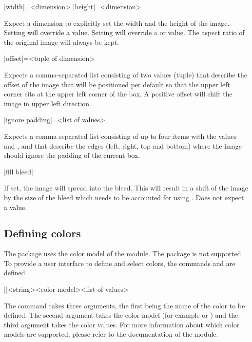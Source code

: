 \documentclass[a4paper]{article}
\begin{document}
\begin{macrodef}
|width|={<dimension>}
|height|={<dimension>}
\end{macrodef}
Expect a dimension to explicitly set the width and the height of the image. Setting  will override a  value. Setting  will override a  or  value. The aspect ratio of the original image will always be kept.

\begin{macrodef}
|offset|={<tuple of dimension>}
\end{macrodef}
Expects a comma-separated list consisting of two values (tuple) that describe the offset of the image that will be positioned per default so that the upper left corner sits at the upper left corner of the box. A positive offset will shift the image in upper left direction.

\begin{macrodef}
|ignore padding|={<list of values>}
\end{macrodef}
Expects a comma-separated list consisting of up to four items with the values  and ,  and  that describe the edges (left, right, top and bottom) where the image should ignore the padding of the current box.

\begin{macrodef}
|fill bleed|
\end{macrodef}
If set, the image will spread into the bleed. This will result in a shift of the image by the size of the bleed which needs to be accounted for using . Does not expect a value.

\subsection{Defining colors}

The package uses the color model of the  module. The  package is not supported. To provide a user interface to define and select colors, the commands \macro{\leporellocolordefine} and \macro{\leporellocolorselect} are defined. 

\begin{macrodef}
|\leporellocolordefine|{<string>}{<color model>}{<list of values>}
\end{macrodef}
The command \macro{\leporellocolordefine} takes three arguments, the first being the name of the color to be defined. The second argument takes the color model (for example  or ) and the third argument takes the color values. For more information about which color models are supported, please refer to the documentation of the  module.
\end{document}
